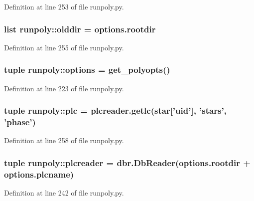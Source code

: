 Definition at line 253 of file runpoly.py.

\hypertarget{namespacerunpoly_a429eb81cafed3ca14e2465cbd91d3224}{
\subsubsection[{olddir}]{\setlength{\rightskip}{0pt plus 5cm}list {\bf runpoly::olddir} = options.rootdir}}
\label{namespacerunpoly_a429eb81cafed3ca14e2465cbd91d3224}


Definition at line 255 of file runpoly.py.

\hypertarget{namespacerunpoly_acec78b48a294e8aafeff4c1745e761b4}{
\subsubsection[{options}]{\setlength{\rightskip}{0pt plus 5cm}tuple {\bf runpoly::options} = get\_\-polyopts()}}
\label{namespacerunpoly_acec78b48a294e8aafeff4c1745e761b4}


Definition at line 223 of file runpoly.py.

\hypertarget{namespacerunpoly_a079d0116a1dcdb50fd810307fa37f4b4}{
\subsubsection[{plc}]{\setlength{\rightskip}{0pt plus 5cm}tuple {\bf runpoly::plc} = plcreader.getlc(star\mbox{[}'uid'\mbox{]}, 'stars', 'phase')}}
\label{namespacerunpoly_a079d0116a1dcdb50fd810307fa37f4b4}


Definition at line 258 of file runpoly.py.

\hypertarget{namespacerunpoly_afb96306fccc8888ba0c85e13ab7a5598}{
\subsubsection[{plcreader}]{\setlength{\rightskip}{0pt plus 5cm}tuple {\bf runpoly::plcreader} = dbr.DbReader(options.rootdir + options.plcname)}}
\label{namespacerunpoly_afb96306fccc8888ba0c85e13ab7a5598}


Definition at line 242 of file runpoly.py.


